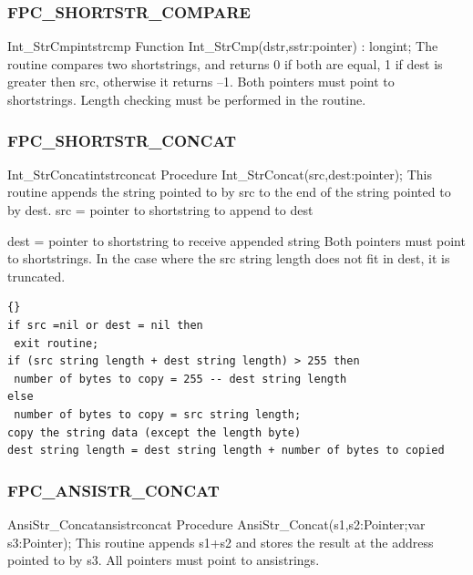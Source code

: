 \documentclass [12pt]{article}
\begin{document}
\subsubsection{FPC{\_}SHORTSTR{\_}COMPARE}
\label{subsubsec:mylabel37}

\begin{functionl}{Int{\_}StrCmp}{intstrcmp}
\Declaration
Function Int{\_}StrCmp(dstr,sstr:pointer) : longint;
\Description 
The routine compares two shortstrings, and returns 0 if both are equal, 1 if
\textsf{dest} is greater then \textsf{src}, otherwise it returns --1.
\Notes 
Both pointers must point to shortstrings. Length checking must be performed
in the routine.
\end{functionl}

\subsubsection{FPC{\_}SHORTSTR{\_}CONCAT}
\label{subsubsec:mylabel38}

\begin{procedurel}{Int{\_}StrConcat}{intstrconcat}
\Declaration
Procedure Int{\_}StrConcat(src,dest:pointer);
\Description 
This routine appends the string pointed to by \textsf{src} to the end of the
string pointed to by \textsf{dest}.
\Parameters 
src  = pointer to shortstring to append to dest \par 
dest = pointer to shortstring to receive appended string
\Notes 
Both pointers must point to shortstrings. In the case where the src string
length does not fit in dest, it is truncated.
\Algorithm
\begin{lstlisting}{}
if src =nil or dest = nil then  
 exit routine; 
if (src string length + dest string length) > 255 then 
 number of bytes to copy = 255 -- dest string length
else
 number of bytes to copy = src string length;
copy the string data (except the length byte)
dest string length = dest string length + number of bytes to copied
\end{lstlisting}
\end{procedurel}

\subsubsection{FPC{\_}ANSISTR{\_}CONCAT}
\label{subsubsec:mylabel39}

\begin{procedurel}{AnsiStr{\_}Concat}{ansistrconcat}
\Declaration
Procedure AnsiStr{\_}Concat(s1,s2:Pointer;var s3:Pointer);
\Description 
This routine appends \textsf{s1}+\textsf{s2} and stores the result at the
address pointed to by \textsf{s3}.
\Notes 
All pointers must point to ansistrings.  
\end{procedurel}
\end{document}
